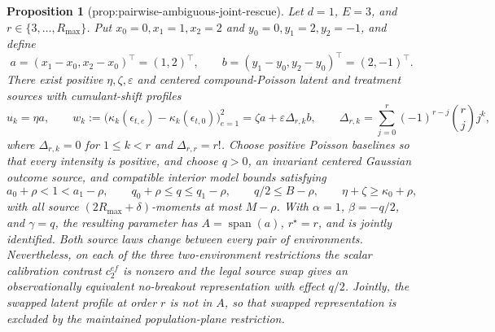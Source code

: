 \documentclass{article}
\newtheorem{proposition}{Proposition}
\begin{document}
\begin{proposition}[prop:pairwise-ambiguous-joint-rescue]\label{prop:pairwise-ambiguous-joint-rescue}
Let \(d=1\), \(E=3\), and \(r\in\{3,\ldots,R_{\max}\}\).  Put \(x_0=0,x_1=1,x_2=2\) and \(y_0=0,y_1=2,y_2=-1\), and define
\[
 a=(x_1-x_0,x_2-x_0)^\top=(1,2)^\top,
 \qquad b=(y_1-y_0,y_2-y_0)^\top=(2,-1)^\top.
\]
There exist positive \(\eta,\zeta,\varepsilon\) and centered compound-Poisson latent and treatment sources with cumulant-shift profiles
\[
 u_k=\eta a,
 \qquad
 w_k:=\bigl(\kappa_k(\epsilon_{t,e})-
                  \kappa_k(\epsilon_{t,0})\bigr)_{e=1}^2
      =\zeta a+\varepsilon\Delta_{r,k}b,
 \qquad
 \Delta_{r,k}=\sum_{j=0}^r(-1)^{r-j}\binom rj j^k,                       \tag{1}
\]
where \(\Delta_{r,k}=0\) for \(1\leq k<r\) and \(\Delta_{r,r}=r!\).  Choose positive Poisson baselines so that every intensity is positive, and choose \(q>0\), an invariant centered Gaussian outcome source, and compatible interior model bounds satisfying
\[
 a_0+\rho<1<a_1-\rho,\qquad
 q_0+\rho\leq q\leq q_1-\rho,\qquad
 q/2\leq B-\rho,\qquad
 \eta+\zeta\geq\kappa_0+\rho,                                           \tag{2}
\]
with all source \((2R_{\max}+\delta)\)-moments at most \(M-\rho\).  With \(\alpha=1\), \(\beta=-q/2\), and \(\gamma=q\), the resulting parameter has \(A=\operatorname{span}(a)\), \(r^\star=r\), and is jointly identified.  Both source laws change between every pair of environments.  Nevertheless, on each of the three two-environment restrictions the scalar calibration contrast \(c_2^{ef}\) is nonzero and the legal source swap gives an observationally equivalent no-breakout representation with effect \(q/2\).  Jointly, the swapped latent profile at order \(r\) is not in \(A\), so that swapped representation is excluded by the maintained population-plane restriction.
\end{proposition}
\end{document}

